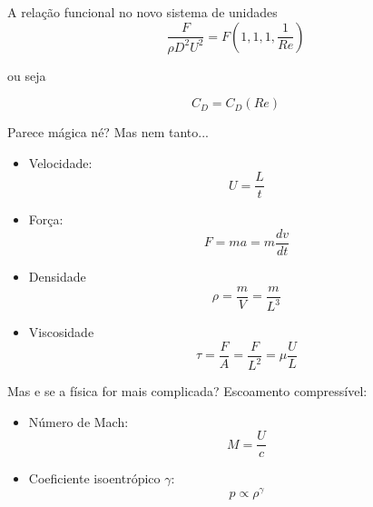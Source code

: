 \documentclass{beamer}
\begin{document}
\begin{frame}{A relação funcional no novo sistema de unidades}
  \[
\frac{F}{\rho D^2 U^2} = F\left(1,1,1, \frac{1}{Re} \right)
\]

ou seja

\[
C_D = C_D(Re)
\]



\end{frame}

\begin{frame}{Parece mágica né?}
  Mas nem tanto...
  \begin{itemize}
  \item Velocidade: \[U = \frac{L}{t}\]
  \item Força: \[F = ma = m\frac{dv}{dt}\]
  \item Densidade \[\rho = \frac{m}{V} = \frac{m}{L^3}\]
  \item Viscosidade \[\tau = \frac{F}{A} = \frac{F}{L^2} = \mu \frac{U}{L}\]
\end{itemize}

\end{frame}

\begin{frame}{Mas e se a física for mais complicada?}
  Escoamento compressível:
  \begin{itemize}
  \item Número de Mach: \[ M = \frac{U}{c} \]
  \item Coeficiente isoentrópico $\gamma$: \[ p \propto \rho^\gamma \]
  \end{itemize}
\end{frame}
\end{document}
